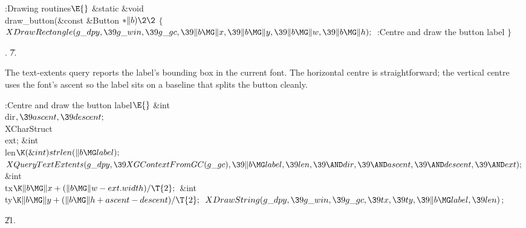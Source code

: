 \Y\B\4:Drawing routines\X${}\E{}$\6
\1\1\&{static} \&{void} \\{draw\_button}(\&{const} \&{Button} ${}{*}\|b)\2\2{}$%
\6
${}\{{}$\1\6
${}\\{XDrawRectangle}(\\{g\_dpy},\39\\{g\_win},\39\\{g\_gc},\39\|b\MG\|x,\39\|b%
\MG\|y,\39\|b\MG\|w,\39\|b\MG\|h);{}$\6
:Centre and draw the button label\X\6
\4${}\}{}$\2\par
{}.
\U7.\fi

The text-extents query reports the label's bounding box in the
current font.  The horizontal centre is straightforward; the vertical
centre uses the font's ascent so the label sits on a baseline that
splits the button cleanly.

\Y\B\4:Centre and draw the button label\X${}\E{}$\6
\&{int} \\{dir}${},\39\\{ascent},\39\\{descent};{}$\7
\\{XCharStruct}\\{ext};\7
\&{int} \\{len}${}\K(\&{int})\,\\{strlen}(\|b\MG\\{label});{}$\7
${}\\{XQueryTextExtents}(\\{g\_dpy},\39\\{XGContextFromGC}(\\{g\_gc}),\39\|b\MG%
\\{label},\39\\{len},\39{\AND}\\{dir},\39{\AND}\\{ascent},\39{\AND}\\{descent},%
\39{\AND}\\{ext});{}$\7
\&{int} \\{tx}${}\K\|b\MG\|x+(\|b\MG\|w-\\{ext}.\\{width})/\T{2};{}$\6
\&{int} \\{ty}${}\K\|b\MG\|y+(\|b\MG\|h+\\{ascent}-\\{descent})/\T{2};{}$\7
${}\\{XDrawString}(\\{g\_dpy},\39\\{g\_win},\39\\{g\_gc},\39\\{tx},\39\\{ty},%
\39\|b\MG\\{label},\39\\{len}){}$;\par
\U21.\fi

